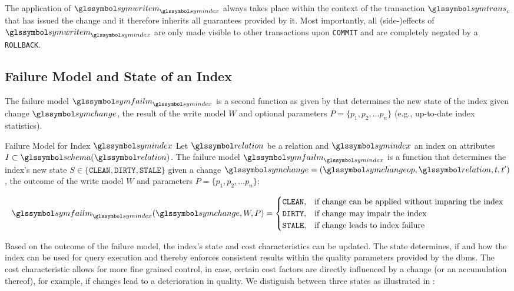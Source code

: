 The application of $\symwritem_{\symindex}$ always takes place within the context of the transaction $\symtrans_c$ that has issued the change and it therefore inherits all guarantees provided by it. Most importantly, all (side-)effects of $\symwritem_{\symindex}$ are only made visible to other transactions upon \texttt{COMMIT} and are completely negated by a \texttt{ROLLBACK}.

\subsection{Failure Model and State of an Index}

The failure model $\symfailm_{\symindex}$ is a second function as given by  that determines the new state of the index given change $\symchange$, the result of the write model $W$ and optional parameters $P = \{p_1, p_2, \ldots p_n\}$ (e.g., up-to-date index statistics).

\begin{definition}[label=definition:failure_model]{Failure Model for Index $\symindex$}{}
    Let $\relation$ be a relation and $\symindex$ an index on attributes $I \subset \schema(\relation)$. The failure model $\symfailm_{\symindex}$ is a function that determines the index's new state $S \in \lbrace \mathtt{CLEAN}, \mathtt{DIRTY}, \mathtt{STALE} \rbrace$ given a change $\symchange = (\symchangeop, \relation, t, t^{\prime})$, the outcome of the write model $W$ and parameters $P = \{p_1, p_2, \ldots p_n\}$:

    \begin{equation*}
        \symfailm_{\symindex}(\symchange,W,P) = 
        \begin{cases}
           \mathtt{CLEAN}, & \text{if change can be applied without imparing the index}\\
           \mathtt{DIRTY}, & \text{if change may impair the index}\\
           \mathtt{STALE}, & \text{if change leads to index failure} \\
        \end{cases}
    \end{equation*}
\end{definition}

Based on the outcome of the failure model, the index's state and cost characteristics can be updated. The state determines, if and how the index can be used for query execution and thereby enforces consistent results within the quality parameters provided by the \acrshort{dbms}. The cost characteristic allows for more fine grained control, in case, certain cost factors are directly influenced by a change (or an accumulation thereof), for example, if changes lead to a deterioration in quality. We distiguish between three states as illustrated in :

